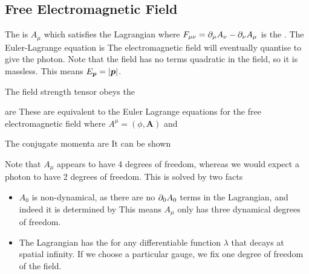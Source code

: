 \documentclass{article}
\begin{document}
\subsection{Free Electromagnetic Field}

The  is $A_\mu$ which satisfies the Lagrangian 
where $F_{\mu\nu} = \partial_\mu A_\nu - \partial_\nu A_\mu$ is the . The Euler-Lagrange equation is 
The electromagnetic field will eventually quantise to give the photon. Note that the field has no terms quadratic in the field, so it is massless. This means $E_{\bm{p}} = \left\lvert \bm{p} \right\rvert$.  

\begin{lemma}
The field strength tensor obeys the  
\end{lemma}

\begin{theorem}
 are 
These are equivalent to the Euler Lagrange equations for the free electromagnetic field where $A^\mu = (\phi, \bm{A})$ and
\end{theorem}

The conjugate momenta are 
It can be shown 

\begin{remark}
Note that $A_\mu$ appears to have 4 degrees of freedom, whereas we would expect a photon to have 2 degrees of freedom. This is solved by two facts 
\begin{itemize}
    \item $A_0$ is non-dynamical, as there are no $\partial_0 A_0$ terms in the Lagrangian, and indeed it is determined by
    This means $A_\mu$ only has three dynamical degrees of freedom. 
    \item The Lagrangian has the  
    for any differentiable function $\lambda$ that decays at spatial infinity. If we choose a particular gauge, we fix one degree of freedom of the field. 
\end{itemize}
\end{remark}
\end{document}
